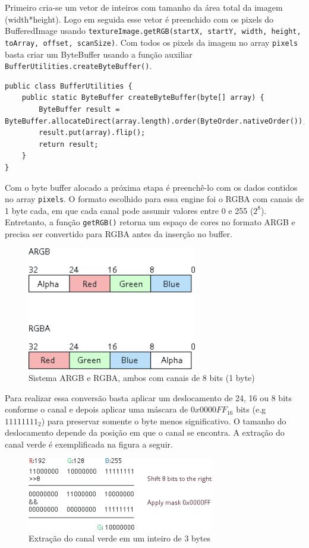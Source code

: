 \documentclass[12pt, 
openright, 
oneside, 
a4paper,    
brazil]{facom-ufu-abntex2}
\begin{document}
Primeiro cria-se um vetor de inteiros com tamanho da área total da imagem (width*height). Logo em seguida esse vetor é preenchido com os pixels do BufferedImage usando \texttt{textureImage.getRGB(startX, startY, width, height, toArray, offset, scanSize)}. Com todos os pixels da imagem no array \texttt{pixels} basta criar um ByteBuffer usando a função auxiliar \texttt{BufferUtilities.createByteBuffer()}.

\begin{lstlisting}[caption=Função auxiliar createByteBuffer]
public class BufferUtilities {
	public static ByteBuffer createByteBuffer(byte[] array) {
		ByteBuffer result = ByteBuffer.allocateDirect(array.length).order(ByteOrder.nativeOrder());
		result.put(array).flip();
		return result;
	} 
}
\end{lstlisting}

Com o byte buffer alocado a próxima etapa é preenchê-lo com os dados contidos no array \texttt{pixels}. O formato escolhido para essa engine foi o RGBA com canais de 1 byte cada, em que cada canal pode assumir valores entre 0 e 255 ($2^8$). Entretanto, a função \texttt{getRGB()} retorna um espaço de cores no formato ARGB e precisa ser convertido para RGBA antes da inserção no buffer.

\begin{figure}[H]
	\centering
	\includegraphics[width=20em]{imagens/sistema_rgba_argb.png}
	\caption{Sistema ARGB e RGBA, ambos com canais de 8 bits (1 byte)}
\end{figure}

Para realizar essa conversão basta aplicar um deslocamento de 24, 16 ou 8 bits conforme o canal e depois aplicar uma máscara de $0x0000FF_{16}$ bits (e.g $11111111_2$) para preservar somente o byte menos significativo. O tamanho do deslocamento depende da posição em que o canal se encontra. A extração do canal verde é exemplificada na figura a seguir.

\begin{figure}[H]
	\centering
	\includegraphics[width=22em]{imagens/extracting_rgb_channel.png}
	\caption{Extração do canal verde em um inteiro de 3 bytes}
\end{figure}
\end{document}
